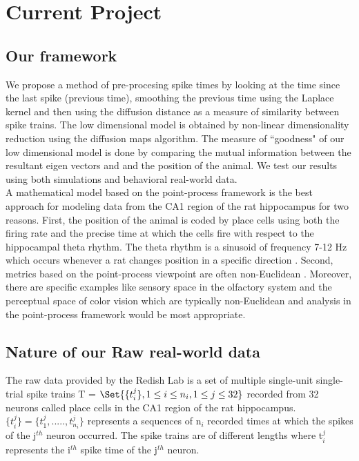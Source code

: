
\section{Current Project}

\subsection{Our framework}

We propose a method of pre-procesing spike times by looking at the time since the 
last spike (previous time), smoothing the previous time using the Laplace kernel
and then using the diffusion distance \cite{coifman2006diffusion} as a measure of similarity
between spike trains. The low dimensional model is obtained by non-linear dimensionality reduction using the diffusion maps algorithm. The measure of ``goodness" of our low dimensional model is done by comparing the mutual information  \cite{quiroga2009extracting, Dayan2001}  between the resultant eigen vectors and and the position of the animal. We test our results using both simulations and behavioral real-world data.\\

A mathematical model based on the point-process framework is the best approach for 
modeling  data from the CA1 region of the rat hippocampus for two reasons.
First, the position of the animal is coded by place cells using both the firing rate
and the precise time at which the cells fire with respect to the hippocampal theta rhythm.
The theta rhythm is a sinusoid of frequency 7-12 Hz which occurs whenever a rat changes
position in  a specific direction \cite{OKeefe1971, Burgess1993}.
Second,  metrics based on the point-process viewpoint are often non-Euclidean \cite{Aronov2004, Victor2005}. Moreover, there are specific examples like sensory space in  the olfactory system and the perceptual space of color vision which are typically non-Euclidean and analysis in the point-process framework would be most appropriate.\\


\subsection{Nature of our Raw real-world data}
The raw data provided by the Redish Lab is a set of multiple single-unit single-trial
spike trains 
T = $\displaystyle \Set{ \{ t_{i}^{j} \} , 1 \leq i \leq n_{i}, 1 \leq j \leq 32 } $ 
recorded from 32 neurons called  place cells  in the CA1 region of the rat hippocampus.
$\displaystyle  \{t_{i}^{j}\} =  \{t_{1}^{j}, ....., t_{n_{i}}^{j} \} $ represents 
a sequences of n$_{i}$ recorded times at which the spikes of the j$^{th}$ neuron occurred.
The spike trains are of different lengths where t$_{i}^{j}$ represents the i$^{th}$
spike time of the j$^{th}$ neuron.


